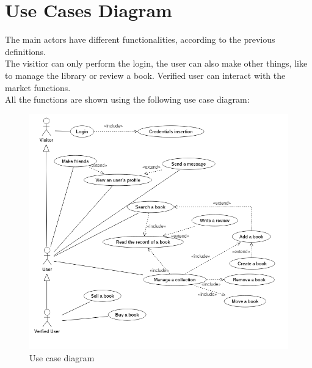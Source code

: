\section{Use Cases Diagram}
The main actors have different functionalities, according to the previous definitions. \\
The visitior can only perform the login, the user can also make other things, like to manage the library or review a book.
Verified user can interact with the market functions.\\
All the functions are shown using the following use case diagram:
\begin{figure}[!ht]
    \centering
	\includegraphics[scale=0.55]{images/use-case-diagram.png}
	\caption{Use case diagram}
	\label{fig:usecasediagram}
\end{figure}

